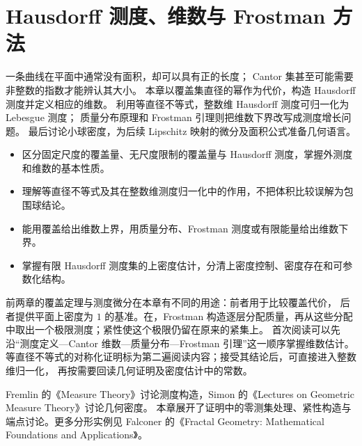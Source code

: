 \chapter{Hausdorff 测度、维数与 Frostman 方法}
\label{b1:ch:15}
\begin{chapterabstract}
一条曲线在平面中通常没有面积，却可以具有正的长度；
Cantor 集甚至可能需要非整数的指数才能辨认其大小。
本章以覆盖集直径的幂作为代价，构造 Hausdorff 测度并定义相应的维数。
利用等直径不等式，整数维 Hausdorff 测度可归一化为 Lebesgue 测度；
质量分布原理和 Frostman 引理则把维数下界改写成测度增长问题。
最后讨论小球密度，为后续 Lipschitz 映射的微分及面积公式准备几何语言。
\end{chapterabstract}

\begin{learninggoals}
\begin{itemize}
\item\label{b1:item:ch15-goal-cover}区分固定尺度的覆盖量、无尺度限制的覆盖量与 Hausdorff 测度，掌握外测度和维数的基本性质。
\item\label{b1:item:ch15-goal-normalize}理解等直径不等式及其在整数维测度归一化中的作用，不把体积比较误解为包围球结论。
\item\label{b1:item:ch15-goal-mass}能用覆盖给出维数上界，用质量分布、Frostman 测度或有限能量给出维数下界。
\item\label{b1:item:ch15-goal-density}掌握有限 Hausdorff 测度集的上密度估计，分清上密度控制、密度存在和可参数化结构。
\end{itemize}
\end{learninggoals}

前两章的覆盖定理与测度微分在本章有不同的用途：前者用于比较覆盖代价，
后者提供平面上密度为 \(1\) 的基准。在，Frostman 构造逐层分配质量，再从这些分配中取出一个极限测度；紧性使这个极限仍留在原来的紧集上。
首次阅读可以先沿“测度定义—Cantor 维数—质量分布—Frostman 引理”这一顺序掌握维数估计。
等直径不等式的对称化证明标为第二遍阅读内容；接受其结论后，可直接进入整数维归一化，
再按需要回读几何证明及密度估计中的常数。

\ProseParagraphBreak

Fremlin 的《Measure Theory》\cite[\S264]{Fremlin2016Measure}讨论测度构造，Simon 的《Lectures on Geometric Measure Theory》\cite[\S\S3--4]{Simon1983Lectures}讨论几何密度。
本章展开了证明中的零测集处理、紧性构造与端点讨论。更多分形实例见 Falconer 的《Fractal Geometry: Mathematical Foundations and Applications》\cite{Falconer2014Fractal}。

